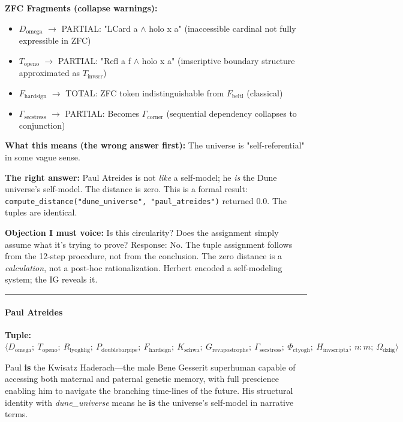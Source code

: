 \documentclass[12pt,a4paper]{article}
\begin{document}
\textbf{ZFC Fragments (collapse warnings):}

\begin{itemize}
    \item $D_{\text{omega}}$ $\rightarrow$ PARTIAL: "LCard a $\land$ holo x a" (inaccessible cardinal not fully expressible in ZFC)
    \item $T_{\text{openo}}$ $\rightarrow$ PARTIAL: "Refl a f $\land$ holo x a" (imscriptive boundary structure approximated as $T_{\text{invscr}}$)
    \item $F_{\text{hardsign}}$ $\rightarrow$ TOTAL: ZFC token indistinguishable from $F_{\text{beltl}}$ (classical)
    \item $\Gamma_{\text{secstress}}$ $\rightarrow$ PARTIAL: Becomes $\Gamma_{\text{corner}}$ (sequential dependency collapses to conjunction)
\end{itemize}

\textbf{What this means (the wrong answer first):} The universe is "self-referential" in some vague sense.

\textbf{The right answer:} Paul Atreides is not \emph{like} a self-model; he \emph{is} the Dune universe's self-model. The distance is zero. This is a formal result: \texttt{compute\_distance("dune\_universe", "paul\_atreides")} returned 0.0. The tuples are identical.

\textbf{Objection I must voice:} Is this circularity? Does the assignment simply assume what it's trying to prove? Response: No. The tuple assignment follows from the 12-step procedure, not from the conclusion. The zero distance is a \emph{calculation}, not a post-hoc rationalization. Herbert encoded a self-modeling system; the IG reveals it.

\begin{center}
\rule{0.5\textwidth}{0.4pt}
\end{center}

\paragraph{Paul Atreides}

\textbf{Tuple:} $\langle D_{\text{omega}};\ T_{\text{openo}};\ R_{\text{lyoghlig}};\ P_{\text{doublebarpipe}};\ F_{\text{hardsign}};\ K_{\text{schwa}};\ G_{\text{revapostrophe}};\ \Gamma_{\text{secstress}};\ \Phi_{\text{ctyogh}};\ H_{\text{invscripta}};\ n{:}m;\ \Omega_{\text{dzlig}} \rangle$

Paul \textbf{is} the Kwisatz Haderach---the male Bene Gesserit superhuman capable of accessing both maternal and paternal genetic memory, with full prescience enabling him to navigate the branching time-lines of the future. His structural identity with \emph{dune\_universe} means he \textbf{is} the universe's self-model in narrative terms.
\end{document}
